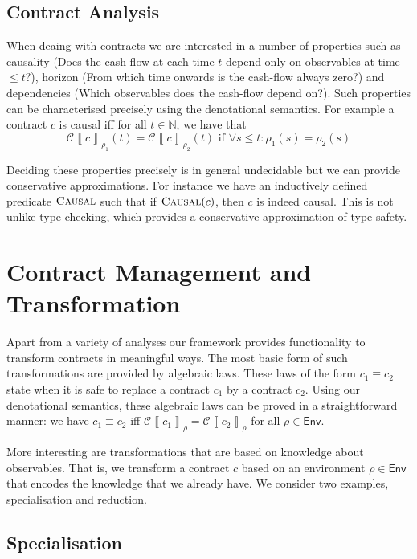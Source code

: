 \documentclass[a4paper,debug,twocolumn]{easychair}
\newcommand{\comm}[3][red]{{\small \color{#1}{$\spadesuit$#2: #3}}}
\newcommand{\pbcomment}[1]{\comm[green]{pb}{#1}}
\newcommand\type[1]{\mathsf{#1}}
\newcommand\nats{{\mathbb N}}
\newcommand\cSem[2]{{\mathcal C}\left\llbracket#1\right\rrbracket_{#2}}
\newcommand\Pred[1]{\textsc{#1}}
\theoremstyle{plain}
\begin{document}
\subsection{Contract Analysis}
\label{sec:contract-analysis}

When deaing with contracts we are interested in a number of properties
such as causality (Does the cash-flow at each time $t$ depend only on
observables at time $\leq t$?), horizon (From which time onwards is
the cash-flow always zero?) and dependencies (Which observables does
the cash-flow depend on?). Such properties can be characterised
precisely using the denotational semantics. For example a contract $c$
is causal iff for all $t \in \nats$, we have that
\[
\cSem c{\rho_1} (t) = \cSem c {\rho_2} (t) \text{ if } \forall s \le t\colon
\rho_1(s)=\rho_2(s)
\]


Deciding these properties precisely is in general undecidable but we
can provide conservative approximations.  For instance we have an
inductively defined predicate $\Pred{Causal}$ such that if
$\Pred{Causal}(c)$, then $c$ is indeed causal. This is not unlike type
checking, which provides a conservative approximation of type safety.


\section{Contract Management and Transformation}
\label{sec:contract-management}

\pbcomment{What do we precisely mean by contract management?}

Apart from a variety of analyses our framework provides functionality
to transform contracts in meaningful ways. The most basic form of such
transformations are provided by algebraic laws. These laws of the form
$c_1 \equiv c_2$ state when it is safe to replace a contract $c_1$ by
a contract $c_2$. Using our denotational semantics, these algebraic
laws can be proved in a straightforward manner: we have $c_1 \equiv
c_2$ iff $\cSem{c_1}\rho = \cSem{c_2}\rho$ for all $\rho \in
\type{Env}$.

More interesting are transformations that are based on knowledge about
observables. That is, we transform a contract $c$ based on an
environment $\rho \in \type{Env}$ that encodes the knowledge that we
already have. We consider two examples, specialisation and reduction.

\subsection{Specialisation}
\label{sec:specialisation}
\end{document}
